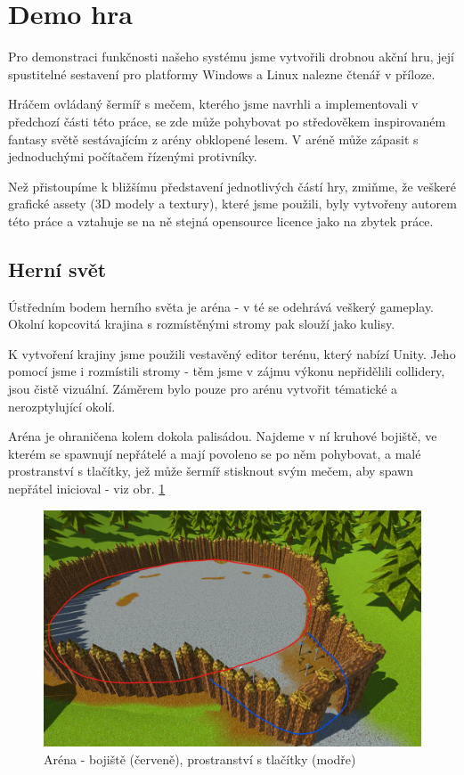 \section{Demo hra}

Pro demonstraci funkčnosti našeho systému jsme vytvořili drobnou akční hru, její spustitelné sestavení pro platformy Windows a Linux nalezne čtenář v příloze.

Hráčem ovládaný šermíř s mečem, kterého jsme navrhli a implementovali v předchozí části této práce, se zde může pohybovat po středověkem inspirovaném fantasy světě sestávajícím z arény obklopené lesem. V aréně může zápasit s jednoduchými počítačem řízenými protivníky.  

Než přistoupíme k bližšímu představení jednotlivých částí hry, zmiňme, že veškeré grafické assety (3D modely a textury), které jsme použili, byly vytvořeny autorem této práce a vztahuje se na ně stejná opensource licence jako na zbytek práce.


\subsection{Herní svět}

Ústředním bodem herního světa je aréna - v té se odehrává veškerý gameplay. Okolní kopcovitá krajina s rozmístěnými stromy pak slouží jako kulisy.

K vytvoření krajiny jsme použili vestavěný editor terénu, který nabízí Unity. Jeho pomocí jsme i rozmístili stromy - těm jsme v zájmu výkonu nepřidělili collidery, jsou čistě vizuální. Záměrem bylo pouze pro arénu vytvořit tématické a nerozptylující okolí.

Aréna je ohraničena kolem dokola palisádou. Najdeme v ní kruhové bojiště, ve kterém se spawnují nepřátelé a mají povoleno se po něm pohybovat, a malé prostranství s tlačítky, jež může šermíř stisknout svým mečem, aby spawn nepřátel inicioval - viz obr. \ref{obr05:demogameArenaLayout} 
\begin{figure}[ht]\centering
  \center
  \includegraphics[width=140mm]{../img/demogameArenaLayout.png}
  \caption{Aréna - bojiště (červeně), prostranství s tlačítky (modře)}
  \label{obr05:demogameArenaLayout}
\end{figure} 

